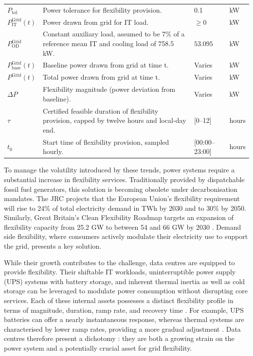 \documentclass[lettersize,journal]{IEEEtran}
\providecommand{\DIFadd}[1]{{\color{blue}#1}}
\providecommand{\DIFaddbegin}{}
\providecommand{\DIFaddend}{}
\providecommand{\DIFaddFL}[1]{\DIFadd{#1}}
\begin{document}
{{\begin{longtable}{p{} p{} p{} p{}}
$P_{\mathrm{tol}}$ & Power tolerance for flexibility provision. & 0.1 &kW \\
$P^{\mathrm{Grid}}_{\mathrm{IT}}(t)$ & Power drawn from grid for IT load. & $\geq 0$ &kW \\
$P^{\mathrm{Grid}}_{\mathrm{OD}}$ & \DIFaddFL{Constant auxiliary load, assumed to be 7\% of a reference mean IT and cooling load of 758.5 kW.} & $53.095$ &kW \\
$P^{\mathrm{Grid}}_{\mathrm{base}}(t)$ & Baseline power drawn from grid at time t. & Varies &kW \\
$P^{\mathrm{Grid}}(t)$ & Total power drawn from grid at time t. & Varies &kW \\
$\Delta P$ & Flexibility magnitude (power deviation from baseline). & Varies &kW \\
$\tau$ & \DIFaddFL{Certified feasible duration of flexibility provision, capped by twelve hours and local-day end.} & \DIFaddFL{[0--12]} & hours \\
$t_0$ & \DIFaddFL{Start time of flexibility provision, sampled hourly.} & \DIFaddFL{[00:00--23:00]} & hours \\
\end{longtable}
\twocolumn
}
} \DIFaddend %
To manage the volatility introduced by these trends, power systems require a substantial increase in flexibility services. Traditionally provided by dispatchable fossil fuel generators, this solution is becoming obsolete under decarbonisation mandates. The JRC \cite{koolen2023flexibility} projects that the European Union’s flexibility requirement will rise to 24\% of total electricity demand in TWh by 2030 and to 30\% by 2050. Similarly, Great Britain’s Clean Flexibility Roadmap targets an expansion of flexibility capacity from 25.2 GW to between 54  \DIFaddbegin \DIFadd{and }\DIFaddend 66 GW by 2030 \cite{clean_flexibility_roadmap}.  \DIFaddbegin \DIFadd{Demand side }\DIFaddend flexibility, where consumers actively modulate their electricity use to support the grid, presents a key solution.

While their growth contributes to the challenge, data centres are equipped to provide flexibility. Their shiftable IT workloads, uninterruptible power supply (UPS) systems with battery storage, and inherent thermal inertia as well as cold storage  can be leveraged to modulate power consumption without disrupting core services. Each of these internal assets possesses a distinct flexibility profile in terms of magnitude, duration, ramp rate, and recovery time \cite{zhang2025unlocking}. For example, UPS batteries can offer a  \DIFaddbegin \DIFadd{nearly }\DIFaddend instantaneous response, whereas thermal systems are characterised by lower ramp rates, providing a more gradual adjustment \cite{zhang2025unlocking, alapera2018data}. Data centres therefore present a dichotomy \DIFaddbegin \DIFadd{: }\DIFaddend they are both a growing strain on the power system and a potentially crucial asset for grid flexibility.
\end{document}
